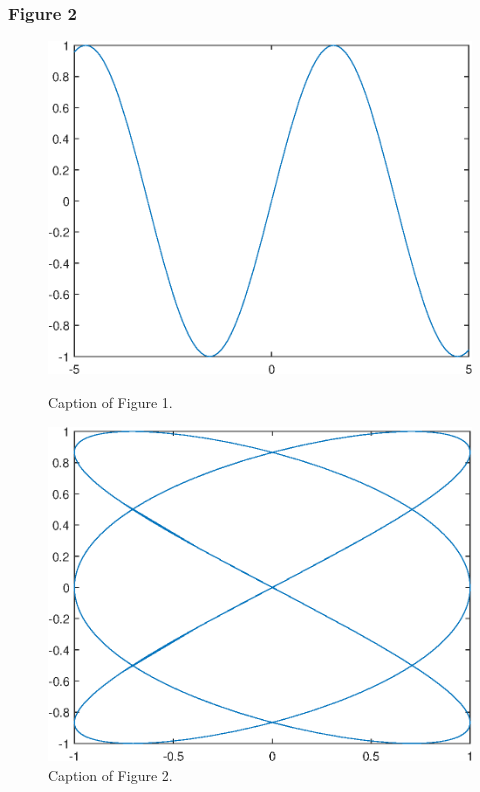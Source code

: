 \documentclass[11pt,compress]{beamer}
\numberwithin{thm}{section}
\numberwithin{defn}{section}
\numberwithin{lmm}{section}
\theoremstyle{example}
\numberwithin{figure}{section}
\numberwithin{table}{section}
\numberwithin{equation}{section}
\begin{document}
\begin{frame}
\frametitle{Figure 2}
\begin{figure}[htb]
\centering
\begin{minipage}{0.48\linewidth}
\centering
\includegraphics[width=\linewidth]{image1}
\caption{Caption of Figure 1.}
\end{minipage}\hfill
\begin{minipage}{0.48\linewidth}
\centering
\includegraphics[width=\linewidth]{image2}
\caption{Caption of Figure 2.}
\end{minipage}
\end{figure}
\end{frame}
\end{document}
